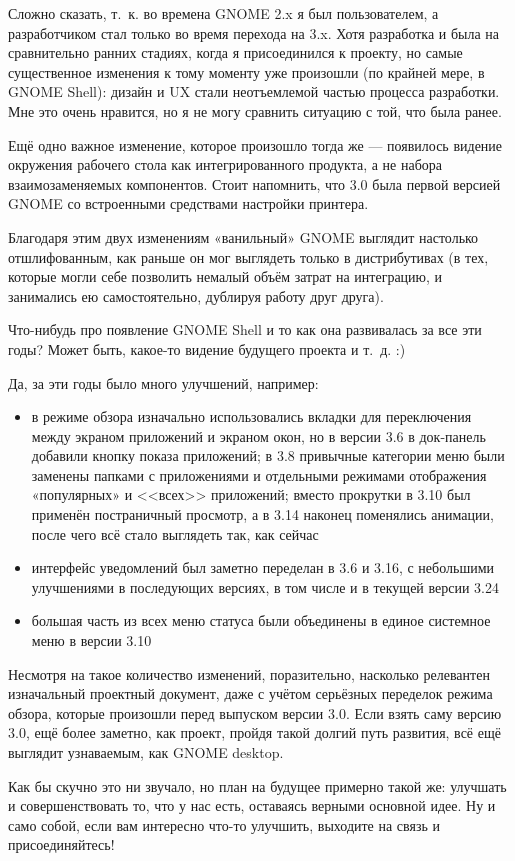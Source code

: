 \documentclass[10pt, a5paper]{article}
\begin{document}
\begin{Parallel}[p]{}{}
{\a Сложно сказать, т.~к. во времена GNOME 2.x я был пользователем, а разработчиком стал только во время перехода на 3.x. Хотя разработка и была на сравнительно ранних стадиях, когда я присоединился к проекту, но самые существенное изменения к тому моменту уже произошли (по крайней мере, в GNOME Shell): дизайн и UX стали неотъемлемой частью процесса разработки. Мне это очень нравится, но я не могу сравнить ситуацию с той, что была ранее.

Ещё одно важное изменение, которое произошло тогда же — появилось видение окружения рабочего стола как интегрированного продукта, а не набора взаимозаменяемых компонентов. Стоит напомнить, что 3.0 была первой версией GNOME со встроенными средствами настройки принтера.

Благодаря этим двух изменениям «ванильный» GNOME выглядит настолько отшлифованным, как раньше он мог выглядеть только в дистрибутивах (в тех, которые могли себе позволить немалый объём затрат на интеграцию, и занимались ею самостоятельно, дублируя работу друг друга).

\q Что-нибудь про появление GNOME Shell и то как она развивалась за все эти годы? Может быть, какое-то видение будущего проекта и т.~д. :)

\a Да, за эти годы было много улучшений, например:
\begin{itemize}
\item в режиме обзора изначально использовались вкладки для переключения между экраном приложений и экраном окон, но в версии 3.6 в док-панель добавили кнопку показа приложений; в 3.8 привычные категории меню были заменены папками с приложениями и отдельными режимами отображения «популярных» и <<всех>> приложений; вместо прокрутки в 3.10 был применён постраничный просмотр, а в 3.14 наконец поменялись анимации, после чего всё стало выглядеть так, как сейчас

\item интерфейс уведомлений был заметно переделан в 3.6 и 3.16, с небольшими улучшениями в последующих версиях, в том числе и в текущей версии 3.24

\item большая часть из всех меню статуса были объединены в единое системное меню в версии 3.10
\end{itemize}

Несмотря на такое количество изменений, поразительно, насколько релевантен изначальный проектный документ\fakefootnote{}, даже с учётом серьёзных переделок режима обзора, которые произошли перед выпуском версии 3.0. Если взять саму версию 3.0\fakefootnote{}, ещё более заметно, как проект, пройдя такой долгий путь развития, всё ещё выглядит узнаваемым, как GNOME desktop.

Как бы скучно это ни звучало, но план на будущее примерно такой же: улучшать и совершенствовать то, что у нас есть, оставаясь верными основной идее. Ну и само собой, если вам интересно что-то улучшить, выходите на связь и присоединяйтесь!


\vfill
     }
   \end{Parallel}
\end{document}
